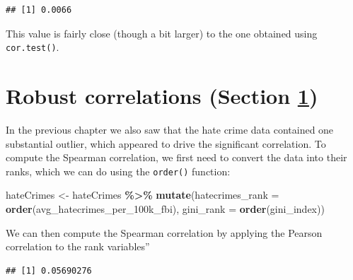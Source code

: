 \documentclass[
  12pt,
]{book}
\newenvironment{Shaded}{\begin{snugshade}}{\end{snugshade}}
\newcommand{\AttributeTok}[1]{\textcolor[rgb]{0.13,0.29,0.53}{#1}}
\newcommand{\FunctionTok}[1]{\textcolor[rgb]{0.13,0.29,0.53}{\textbf{#1}}}
\newcommand{\NormalTok}[1]{#1}
\newcommand{\OtherTok}[1]{\textcolor[rgb]{0.56,0.35,0.01}{#1}}
\newcommand{\SpecialCharTok}[1]{\textcolor[rgb]{0.81,0.36,0.00}{\textbf{#1}}}
\begin{document}
\begin{Shaded}
\end{Shaded}

\begin{verbatim}
## [1] 0.0066
\end{verbatim}

This value is fairly close (though a bit larger) to the one obtained using \texttt{cor.test()}.

\hypertarget{robust-correlations}{%
\section{Robust correlations (Section \ref{robust-correlations})}\label{robust-correlations}}

In the previous chapter we also saw that the hate crime data contained one substantial outlier, which appeared to drive the significant correlation. To compute the Spearman correlation, we first need to convert the data into their ranks, which we can do using the \texttt{order()} function:

\begin{Shaded}
\begin{Highlighting}[]
\NormalTok{hateCrimes }\OtherTok{\textless{}{-}}\NormalTok{ hateCrimes }\SpecialCharTok{\%\textgreater{}\%}
  \FunctionTok{mutate}\NormalTok{(}\AttributeTok{hatecrimes\_rank =} \FunctionTok{order}\NormalTok{(avg\_hatecrimes\_per\_100k\_fbi),}
         \AttributeTok{gini\_rank =} \FunctionTok{order}\NormalTok{(gini\_index))}
\end{Highlighting}
\end{Shaded}

We can then compute the Spearman correlation by applying the Pearson correlation to the rank variables''

\begin{Shaded}
\end{Shaded}

\begin{verbatim}
## [1] 0.05690276
\end{verbatim}
\end{document}
